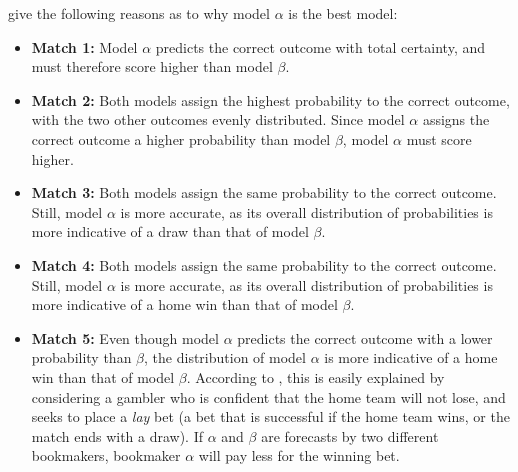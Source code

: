 \citeauthor{bib:constantinou-fenton-2012} give the following reasons as to why model $\alpha$ is the best model:
\begin{itemize}
    \item \textbf{Match 1:} Model $\alpha$ predicts the correct outcome with total certainty, and must therefore score higher than model $\beta$.
    \item \textbf{Match 2:} Both models assign the highest probability to the correct outcome, with the two other outcomes evenly distributed. Since model $\alpha$ assigns the correct outcome a higher probability than model $\beta$, model $\alpha$ must score higher.
    \item \textbf{Match 3:} Both models assign the same probability to the correct outcome. Still, model $\alpha$ is more accurate, as its overall distribution of probabilities is more indicative of a draw than that of model $\beta$.
    \item \textbf{Match 4:} Both models assign the same probability to the correct outcome. Still, model $\alpha$ is more accurate, as its overall distribution of probabilities is more indicative of a home win than that of model $\beta$.
    \item \textbf{Match 5:} Even though model $\alpha$ predicts the correct outcome with a lower probability than $\beta$, the distribution of model $\alpha$ is more indicative of a home win than that of model $\beta$. According to \citeauthor{bib:constantinou-fenton-2012}, this is easily explained by considering a gambler who is confident that the home team will not lose, and seeks to place a \textit{lay} bet (a bet that is successful if the home team wins, or the match ends with a draw). If $\alpha$ and $\beta$ are forecasts by two different bookmakers, bookmaker $\alpha$ will pay less for the winning bet.
\end{itemize}


